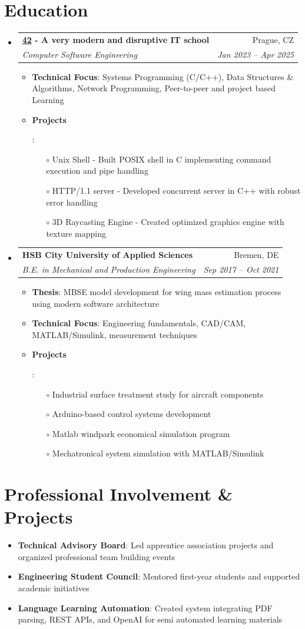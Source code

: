 \documentclass[letterpaper,10pt]{article}
\makeatletter
\newcommand{\resumeItem}[2]{
  \item\small{
    \textbf{#1}{: #2 \vspace{-1pt}}
  }
}
\newcommand{\resumeSubheading}[4]{
  \vspace{-2pt}\item
    \begin{tabular*}{0.97\textwidth}[t]{l@{\extracolsep{\fill}}r}
      \textbf{#1} & #2 \\
      \textit{\small#3} & \textit{\small #4}
    \end{tabular*}\vspace{-4pt}
}
\newcommand{\resumeSubItem}[2]{\resumeItem{#1}{#2}\vspace{-1pt}}
\newcommand{\resumeSubHeadingListStart}{\begin{itemize}[leftmargin=*,label={},itemsep=0pt]}
\newcommand{\resumeSubHeadingListStartBullets}{\begin{itemize}[leftmargin=*,itemsep=0pt]}
\newcommand{\resumeSubHeadingListEnd}{\end{itemize}}
\newcommand{\resumeItemListStart}{\begin{itemize}[itemsep=1pt]}
\newcommand{\resumeItemListEnd}{\end{itemize}}
\newcommand{\projectSubItem}[1]{\item[$\circ$]\small{#1}\vspace{0.5pt}}
\makeatother
\begin{document}
\section{Education}
\resumeSubHeadingListStart
\resumeSubheading
{\href{https://42.fr/en/homepage/}{42} - A very modern and disruptive IT school}{Prague, CZ}
{Computer Software Engineering}{Jan 2023 -- Apr 2025}
\resumeItemListStart
\resumeItem{Technical Focus}{Systems Programming (C/C++), Data Structures \& Algorithms, Network Programming, Peer-to-peer and project based Learning}
\resumeItem{Projects}{
\begin{itemize}[leftmargin=*]
	\projectSubItem{Unix Shell - Built POSIX shell in C implementing command execution and pipe handling}
	\projectSubItem{HTTP/1.1 server - Developed concurrent server in C++ with robust error handling}
	\projectSubItem{3D Raycasting Engine - Created optimized graphics engine with texture mapping}
\end{itemize}}
\resumeItemListEnd
\resumeSubHeadingListEnd

\resumeSubHeadingListStart
\resumeSubheading
{HSB City University of Applied Sciences}{Bremen, DE}
{B.E. in Mechanical and Production Engineering}{Sep 2017 -- Oct 2021}
\resumeItemListStart
\resumeItem{Thesis}{MBSE model development for wing mass estimation process using modern software architecture}
\resumeItem{Technical Focus}{Engineering fundamentals, CAD/CAM, MATLAB/Simulink, measurement techniques}
\resumeItem{Projects}{
\begin{itemize}[leftmargin=*]
	\projectSubItem{Industrial surface treatment study for aircraft components}
	\projectSubItem{Arduino-based control systems development}
	\projectSubItem{Matlab windpark economical simulation program}
	\projectSubItem{Mechatronical system simulation with MATLAB/Simulink}
\end{itemize}}
\resumeItemListEnd
\resumeSubHeadingListEnd

\section{Professional Involvement \& Projects}
\resumeSubHeadingListStartBullets
\resumeSubItem{Technical Advisory Board}
{Led apprentice association projects and organized professional team building events}
\resumeSubItem{Engineering Student Council}
{Mentored first-year students and supported academic initiatives}
\resumeSubItem{Language Learning Automation}
{Created system integrating PDF parsing, REST APIs, and OpenAI for semi automated learning materials}
\resumeSubHeadingListEnd
\end{document}
